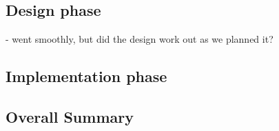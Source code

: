         
    \subsection{Design phase} - went smoothly, but did the design work out as we planned it?
    \subsection{Implementation phase}
    \subsection{Overall Summary}    




